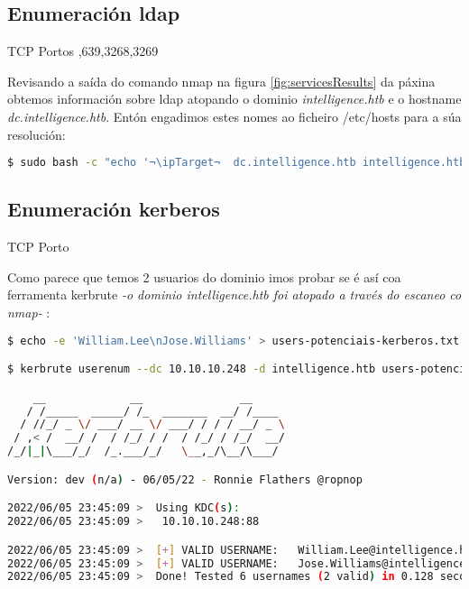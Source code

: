 \documentclass[a4paper]{article}
\newcommand{\ipTarget}{10.10.10.248}
\begin{document}
        \subsection{Enumeración ldap}
        \vspace{0.2cm}

        \begin{schema}{TCP}
        Portos
        ,639,3268,3269
        \end{schema}
 Revisando a saída do comando nmap na figura \ref{fig:servicesResults} da páxina \pageref{fig:servicesResults} obtemos información sobre ldap atopando o dominio \textit{intelligence.htb} e o hostname \textit{dc.intelligence.htb}. Entón engadimos estes nomes ao ficheiro /etc/hosts para a súa resolución:
        \begin{lstlisting}[language=Bash, caption=Resolución DNS: /etc/hosts]
$ sudo bash -c "echo '¬\ipTarget¬  dc.intelligence.htb intelligence.htb' >> /etc/hosts"\end{lstlisting}

        \subsection{Enumeración kerberos}
        \vspace{0.2cm}

        \begin{schema}{TCP}
        Porto
        \end{schema}
 
        Como parece que temos 2 usuarios do dominio imos probar se é así coa ferramenta kerbrute \textit{-o dominio intelligence.htb foi atopado a través do escaneo co nmap-} :

        \begin{lstlisting}[language=Bash, caption=Enumeración usuarios kerberos: kerbrute]
$ echo -e 'William.Lee\nJose.Williams' > users-potenciais-kerberos.txt

$ kerbrute userenum --dc 10.10.10.248 -d intelligence.htb users-potenciais-kerberos.txt

    __             __               __     
   / /_____  _____/ /_  _______  __/ /____ 
  / //_/ _ \/ ___/ __ \/ ___/ / / / __/ _ \
 / ,< /  __/ /  / /_/ / /  / /_/ / /_/  __/
/_/|_|\___/_/  /_.___/_/   \__,_/\__/\___/                                        

Version: dev (n/a) - 06/05/22 - Ronnie Flathers @ropnop

2022/06/05 23:45:09 >  Using KDC(s):
2022/06/05 23:45:09 >  	10.10.10.248:88

2022/06/05 23:45:09 >  [+] VALID USERNAME:	 William.Lee@intelligence.htb
2022/06/05 23:45:09 >  [+] VALID USERNAME:	 Jose.Williams@intelligence.htb
2022/06/05 23:45:09 >  Done! Tested 6 usernames (2 valid) in 0.128 seconds

\end{lstlisting}
\end{document}
